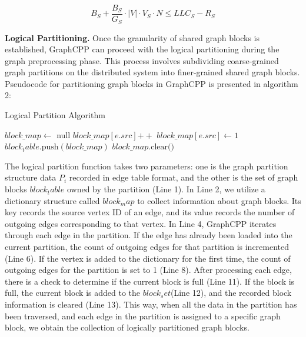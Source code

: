 \documentclass[lettersize,journal]{IEEEtran} %
\begin{document}
\begin{equation}
    B_S + \frac{B_S}{G_S} \cdot \lvert V \rvert \cdot V_S \cdot N \leq LLC_S - R_S
    \end{equation}

{\bf{Logical Partitioning.}} Once the granularity of shared graph blocks is established, GraphCPP can proceed with the logical partitioning during the graph preprocessing phase. This process involves subdividing coarse-grained graph partitions on the distributed system into finer-grained shared graph blocks. Pseudocode for partitioning graph blocks in GraphCPP is presented in algorithm 2:

\begin{algorithm}
\caption{Logical Partition Algorithm}
\begin{algorithmic}[1]
    \State $block\_map \gets$ null
            \State $block\_map[e.src] \mathrel{+{+}}$
        \Else
            \State $block\_map[e.src] \gets 1$
        \EndIf
            \State $block_table.\text{push}(block\_map)$
            \State $block\_map.\text{clear()}$
        \EndIf
    \EndFor
\EndFunction
\end{algorithmic}
\end{algorithm}

The logical partition function takes two parameters: one is the graph partition structure data $P_i$ recorded in edge table format, and the other is the set of graph blocks $block_table$ owned by the partition (Line 1). In Line 2, we utilize a dictionary structure called $block_map$ to collect information about graph blocks. Its key records the source vertex ID of an edge, and its value records the number of outgoing edges corresponding to that vertex. In Line 4, GraphCPP iterates through each edge in the partition. If the edge has already been loaded into the current partition, the count of outgoing edges for that partition is incremented (Line 6). If the vertex is added to the dictionary for the first time, the count of outgoing edges for the partition is set to 1 (Line 8). After processing each edge, there is a check to determine if the current block is full (Line 11). If the block is full, the current block is added to the $block_set $(Line 12), and the recorded block information is cleared (Line 13). This way, when all the data in the partition has been traversed, and each edge in the partition is assigned to a specific graph block, we obtain the collection of logically partitioned graph blocks.
\end{document}
